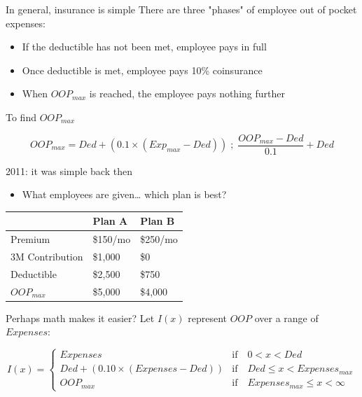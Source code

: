 \documentclass[sans,aspectratio=169,presentation,bigger,fleqn]{beamer}
\begin{document}
\begin{frame}[label=sec-9]{In general, insurance is simple}
There are three "phases" of employee out of pocket expenses:
\begin{itemize}
\item If the \alert{deductible} has not been met, employee pays in full
\item Once deductible is met, employee pays 10\% coinsurance
\item When \alert{\(OOP_{max}\)} is reached, the employee pays nothing further
\end{itemize}

\vspace{0.5cm}

To find \(OOP_{max}\)

\footnotesize
\[
OOP_{max} = Ded + (0.1 \times (Exp_{max} - Ded)) \; ; \; \frac{OOP_{max} - Ded}{0.1} + Ded
\]
\normalsize
\end{frame}
\begin{frame}[label=sec-10]{2011: it was simple back then}
\begin{itemize}
\item What employees are given\ldots{} which plan is best?
\end{itemize}

\begin{center}
\begin{tabular}{lll}
\toprule
 & Plan A & Plan B\\
\midrule
Premium & \$150/mo & \$250/mo\\
3M Contribution & \$1,000 & \$0\\
Deductible & \$2,500 & \$750\\
\(OOP_{max}\) & \$5,000 & \$4,000\\
\bottomrule
\end{tabular}
\end{center}
\end{frame}
\begin{frame}[label=sec-11]{Perhaps math makes it easier?}
Let \(I(x)\) represent \(OOP\) over a range of \(Expenses\):

\footnotesize
\setlength{\mathindent}{0cm}
\[
I(x) = \begin{cases}
Expenses & \text{if} \quad 0 < x < Ded \\
Ded + (0.10 \times (Expenses - Ded)) & \text{if} \quad Ded  \le x <  Expenses_{max} \\     
OOP_{max} & \text{if} \quad Expenses_{max} \le x < \infty
\end{cases}
\]
\normalsize
\end{frame}
\end{document}
